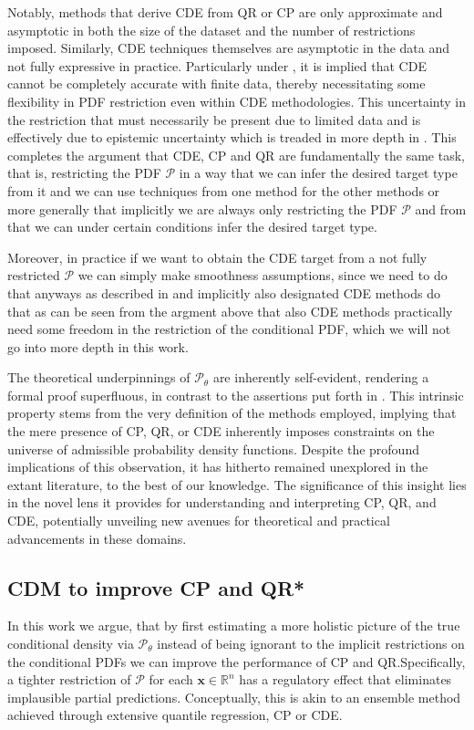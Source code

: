 Notably, methods that derive CDE from QR or CP are only approximate and asymptotic in both the size of the dataset and the number of restrictions imposed. Similarly, CDE techniques themselves are asymptotic in the data and not fully expressive in practice. Particularly under , it is implied that CDE cannot be completely accurate with finite data, thereby necessitating some flexibility in PDF restriction even within CDE methodologies. This uncertainty in the restriction that must necessarily be present due to limited data and  is effectively due to epistemic uncertainty which is treaded in more depth in . This completes the argument that CDE, CP and QR are fundamentally the same task, that is, restricting the PDF $\mathcal{P}$ in a way that we can infer the desired target type from it and we can use techniques from one method for the other methods or more generally that implicitly we are always only restricting the PDF $\mathcal{P}$ and from that we can under certain conditions infer the desired target type.

Moreover, in practice if we want to obtain the CDE target from a not fully restricted $\mathcal{P}$ we can simply make smoothness assumptions, since we need to do that anyways as described in  and implicitly also designated CDE methods do that as can be seen from the argment above that also CDE methods practically need some freedom in the restriction of the conditional PDF, which we will not go into more depth in this work.

The theoretical underpinnings of $\mathscr{P}_\theta$ are inherently self-evident, rendering a formal proof superfluous, in contrast to the assertions put forth in . This intrinsic property stems from the very definition of the methods employed, implying that the mere presence of CP, QR, or CDE inherently imposes constraints on the universe of admissible probability density functions. Despite the profound implications of this observation, it has hitherto remained unexplored in the extant literature, to the best of our knowledge. The significance of this insight lies in the novel lens it provides for understanding and interpreting CP, QR, and CDE, potentially unveiling new avenues for theoretical and practical advancements in these domains.

\subsection{CDM to improve CP and QR*}
In this work we argue, that by first estimating a more holistic picture of the true conditional density via $\mathscr{P}_\theta$ instead of being ignorant to the implicit restrictions on the conditional PDFs we can improve the performance of CP and QR.\@ Specifically, a tighter restriction of $\mathcal{P}$ for each $\mathbf{x}\in\mathbb{R}^n$ has a regulatory effect that eliminates implausible partial predictions. Conceptually, this is akin to an ensemble method achieved through extensive quantile regression, CP or CDE.\@

